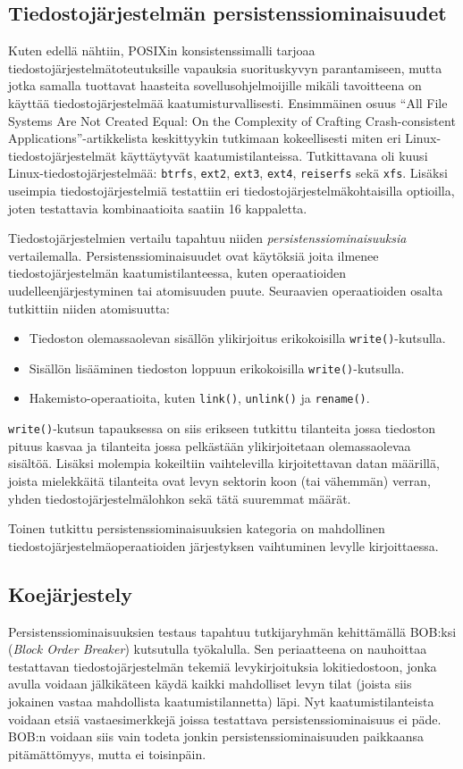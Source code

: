 \subsection{Tiedostojärjestelmän persistenssiominaisuudet}
Kuten edellä nähtiin, POSIXin konsistenssimalli tarjoaa tiedostojärjestelmätoteutuksille vapauksia suorituskyvyn parantamiseen,
mutta jotka samalla tuottavat haasteita sovellusohjelmoijille mikäli tavoitteena on käyttää tiedostojärjestelmää kaatumisturvallisesti.
Ensimmäinen osuus ``All File Systems Are Not Created Equal: On the Complexity of Crafting Crash-consistent Applications''-artikkelista keskittyykin tutkimaan kokeellisesti
miten eri Linux-tiedostojärjestelmät käyttäytyvät kaatumistilanteissa.
Tutkittavana oli kuusi Linux-tiedostojärjestelmää: \texttt{btrfs}, \texttt{ext2}, \texttt{ext3}, \texttt{ext4}, \texttt{reiserfs} sekä \texttt{xfs}.
Lisäksi useimpia tiedostojärjestelmiä testattiin eri tiedostojärjestelmäkohtaisilla optioilla,
joten testattavia kombinaatioita saatiin 16 kappaletta.

Tiedostojärjestelmien vertailu tapahtuu niiden \emph{persistenssiominaisuuksia} vertailemalla.
Persistenssiominaisuudet ovat käytöksiä joita ilmenee tiedostojärjestelmän kaatumistilanteessa,
kuten operaatioiden uudelleenjärjestyminen tai atomisuuden puute.
Seuraavien operaatioiden osalta tutkittiin niiden atomisuutta:
%
\begin{itemize}
    \item{Tiedoston olemassaolevan sisällön ylikirjoitus erikokoisilla \texttt{write()}-kutsulla.}
    \item{Sisällön lisääminen tiedoston loppuun erikokoisilla \texttt{write()}-kutsulla.}
    \item{Hakemisto-operaatioita, kuten \texttt{link()}, \texttt{unlink()} ja \texttt{rename()}.}
\end{itemize}
%
\texttt{write()}-kutsun tapauksessa on siis erikseen tutkittu tilanteita jossa tiedoston pituus kasvaa ja tilanteita jossa pelkästään ylikirjoitetaan olemassaolevaa sisältöä.
Lisäksi molempia kokeiltiin vaihtelevilla kirjoitettavan datan määrillä,
joista mielekkäitä tilanteita ovat levyn sektorin koon (tai vähemmän) verran, yhden tiedostojärjestelmälohkon sekä tätä suuremmat määrät.

Toinen tutkittu persistenssiominaisuuksien kategoria on mahdollinen tiedostojärjestelmäoperaatioiden järjestyksen vaihtuminen levylle kirjoittaessa.

\subsection{Koejärjestely}
Persistenssiominaisuuksien testaus tapahtuu tutkijaryhmän kehittämällä BOB:ksi (\emph{Block Order Breaker}) kutsutulla työkalulla.
Sen periaatteena on nauhoittaa testattavan tiedostojärjestelmän tekemiä levykirjoituksia lokitiedostoon,
jonka avulla voidaan jälkikäteen käydä kaikki mahdolliset levyn tilat (joista siis jokainen vastaa mahdollista kaatumistilannetta) läpi.
Nyt kaatumistilanteista voidaan etsiä vastaesimerkkejä joissa testattava persistenssiominaisuus ei päde.
BOB:n voidaan siis vain todeta jonkin persistenssiominaisuuden paikkaansa pitämättömyys, mutta ei toisinpäin.

